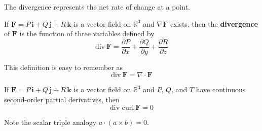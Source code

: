 \documentclass[../main.tex]{subfiles}
\begin{document}
The divergence represents the net rate of change at a point.
\begin{definition}[Divergence]
If $\textbf{F} = P\,\textbf{i} + Q\,\textbf{j} + R\,\textbf{k}$ is a vector field on $\mathbb{R}^3$ and $\nabla \textbf{F}$ exists, then the \textbf{divergence} of $\textbf{F}$ is the function of three variables defined by
\begin{equation}
\text{div}\ \textbf{F} = \frac{\partial P}{\partial x} + \frac{\partial Q}{\partial y} + \frac{\partial R}{\partial z}
\end{equation}
\end{definition}
\noindent This definition is easy to remember as
\begin{equation}
\text{div}\ \textbf{F} = \nabla \cdot \textbf{F}
\end{equation}
\begin{theorem}
If $\textbf{F} = P\,\textbf{i} + Q\,\textbf{j} + R\,\textbf{k}$ is a vector field on $\mathbb{R}^3$ and $P$, $Q$, and $T$ have continuous second-order partial derivatives, then
\begin{equation}
\text{div curl}\ \textbf{F} = 0
\end{equation}
\end{theorem}
Note the scalar triple analogy $a \cdot (a \times b ) = 0$.
\end{document}
